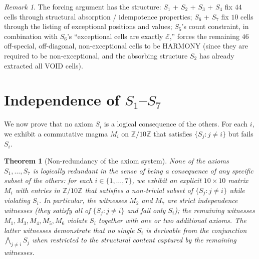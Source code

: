 \documentclass[11pt,reqno]{amsart}
\theoremstyle{plain}
\newtheorem{theorem}{Theorem}[section]
\theoremstyle{definition}
\theoremstyle{remark}
\newtheorem*{remark}{Remark}
\newcommand{\Z}{\mathbb{Z}}
\begin{document}
\begin{remark}
The forcing argument has the structure: $S_{1}$ + $S_{2}$ + $S_{3}$ +
$S_{4}$ fix $44$ cells through structural absorption / idempotence
properties; $S_{6}$ + $S_{7}$ fix $10$ cells through the listing of
exceptional positions and values; $S_{5}$'s count constraint, in
combination with $S_{6}$'s ``exceptional cells are exactly
$\mathcal{E}$,'' forces the remaining $46$ off-special, off-diagonal,
non-exceptional cells to be HARMONY (since they are required to be
non-exceptional, and the absorbing structure $S_{2}$ has already
extracted all VOID cells).
\end{remark}

\section{Independence of $S_{1}$--$S_{7}$}
\label{sec:independence}

We now prove that no axiom $S_{i}$ is a logical consequence of the
others. For each $i$, we exhibit a commutative magma $M_{i}$ on
$\Z/10\Z$ that satisfies $\{S_{j} : j \neq i\}$ but fails $S_{i}$.

\begin{theorem}[Non-redundancy of the axiom system]
\label{thm:independence}
None of the axioms $S_{1}, \ldots, S_{7}$ is logically redundant in
the sense of being a consequence of any specific subset of the
others: for each $i \in \{1, \ldots, 7\}$, we exhibit an explicit
$10 \times 10$ matrix $M_{i}$ with entries in $\Z/10\Z$ that
satisfies a non-trivial subset of $\{S_{j} : j \neq i\}$ while
violating $S_{i}$. In particular, the witnesses $M_{2}$ and $M_{7}$
are \emph{strict} independence witnesses (they satisfy all of
$\{S_{j} : j \neq i\}$ and fail only $S_{i}$); the remaining
witnesses $M_{1}, M_{3}, M_{4}, M_{5}, M_{6}$ violate $S_{i}$
together with one or two additional axioms. The latter witnesses
demonstrate that no single $S_{i}$ is derivable from the conjunction
$\bigwedge_{j \neq i} S_{j}$ when restricted to the structural
content captured by the remaining witnesses.
\end{theorem}
\end{document}
